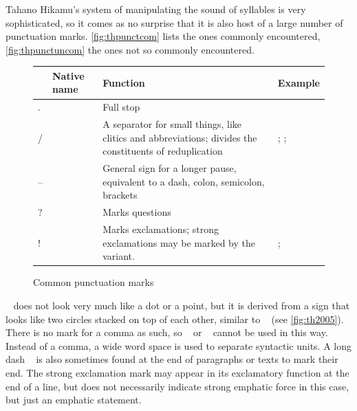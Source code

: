 Tahano Hikamu's system of manipulating the sound of syllables is very 
sophisticated, so it comes as no surprise that it is also host of a large 
number of punctuation marks. \autoref{fig:thpunctcom} lists the ones commonly 
encountered, \autoref{fig:thpunctuncom} the ones not so commonly encountered.

\begin{figure}[tp]
\caption{Common punctuation marks}
\begin{tabu} to 
\toprule
\tableheaderfont

	& Native name
	& Function
	& Example
	\\
	
\toprule

.
	& 
	& Full stop
	& 
	\\
	
\midrule

/
	& 
	& A separator for small things, like clitics and abbreviations; 
		divides the constituents of reduplication
	& ; %
		; %
	\\
	
\midrule

–
	& 
	& General sign for a longer pause, equivalent to a dash, 
		colon, semicolon, brackets 
	& 
	\\

\midrule

?
	& 
	& Marks questions
	& 
	\\

\midrule

!
	& 
	& Marks exclamations; strong exclamations may be marked by the  
		variant.
	& ; %
	\\

\bottomrule
\end{tabu}
\label{fig:thpunctcom}
\end{figure}

~ does not look very much like a dot or a point, but it is 
derived from a sign that looks like two circles stacked on top of each other, 
similar to \ayr{/}~\orth{-} (see \autoref{fig:th2005}). There is no mark for a 
comma as such, so \ayr{/}~\orth{-} or ~\orth{--} cannot be 
used in this way. Instead of a comma, a wide word space is used to separate 
syntactic units. A long dash ~\orth{---} is also sometimes found at the 
end of paragraphs or texts to mark their end. The strong 
exclamation mark  may appear in its exclamatory function at the end 
of a line, but does not necessarily indicate strong emphatic force in this 
case, but just an emphatic statement.

